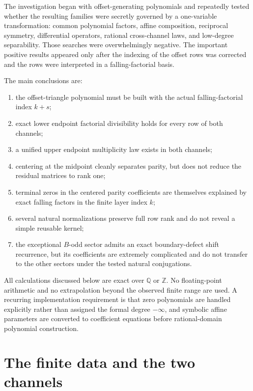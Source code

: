\documentclass[11pt,a4paper]{article}
\newcommand{\Q}{\mathbb{Q}}
\newcommand{\Z}{\mathbb{Z}}
\begin{document}
The investigation began with offset-generating polynomials and repeatedly tested whether the resulting families were secretly governed by a one-variable transformation: common polynomial factors, affine composition, reciprocal symmetry, differential operators, rational cross-channel laws, and low-degree separability.  Those searches were overwhelmingly negative.  The important positive results appeared only after the indexing of the offset rows was corrected and the rows were interpreted in a falling-factorial basis.

The main conclusions are:
\begin{enumerate}[label=(\roman*)]
  \item the offset-triangle polynomial must be built with the actual falling-factorial index $k+s$;
  \item exact lower endpoint factorial divisibility holds for every row of both channels;
  \item a unified upper endpoint multiplicity law exists in both channels;
  \item centering at the midpoint cleanly separates parity, but does not reduce the residual matrices to rank one;
  \item terminal zeros in the centered parity coefficients are themselves explained by exact falling factors in the finite layer index $k$;
  \item several natural normalizations preserve full row rank and do not reveal a simple reusable kernel;
  \item the exceptional $B$-odd sector admits an exact boundary-defect shift recurrence, but its coefficients are extremely complicated and do not transfer to the other sectors under the tested natural conjugations.
\end{enumerate}

All calculations discussed below are exact over $\Q$ or $\Z$.  No floating-point arithmetic and no extrapolation beyond the observed finite range are used.  A recurring implementation requirement is that zero polynomials are handled explicitly rather than assigned the formal degree $-\infty$, and symbolic affine parameters are converted to coefficient equations before rational-domain polynomial construction.

\section{The finite data and the two channels}
\end{document}

